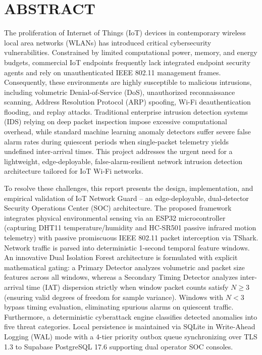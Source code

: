 \documentclass[11pt,a4paper]{report}
\begin{document}
\clearpage

\chapter*{ABSTRACT}
\thispagestyle{plain}
\setcounter{page}{3}

The proliferation of Internet of Things (IoT) devices in contemporary wireless local area networks (WLANs) has introduced critical cybersecurity vulnerabilities. Constrained by limited computational power, memory, and energy budgets, commercial IoT endpoints frequently lack integrated endpoint security agents and rely on unauthenticated IEEE 802.11 management frames. Consequently, these environments are highly susceptible to malicious intrusions, including volumetric Denial-of-Service (DoS), unauthorized reconnaissance scanning, Address Resolution Protocol (ARP) spoofing, Wi-Fi deauthentication flooding, and replay attacks. Traditional enterprise intrusion detection systems (IDS) relying on deep packet inspection impose excessive computational overhead, while standard machine learning anomaly detectors suffer severe false alarm rates during quiescent periods when single-packet telemetry yields undefined inter-arrival times. This project addresses the urgent need for a lightweight, edge-deployable, false-alarm-resilient network intrusion detection architecture tailored for IoT Wi-Fi networks.

To resolve these challenges, this report presents the design, implementation, and empirical validation of IoT Network Guard -- an edge-deployable, dual-detector Security Operations Center (SOC) architecture. The proposed framework integrates physical environmental sensing via an ESP32 microcontroller (capturing DHT11 temperature/humidity and HC-SR501 passive infrared motion telemetry) with passive promiscuous IEEE 802.11 packet interception via TShark. Network traffic is parsed into deterministic 1-second temporal feature windows. An innovative Dual Isolation Forest architecture is formulated with explicit mathematical gating: a Primary Detector analyzes volumetric and packet size features across all windows, whereas a Secondary Timing Detector analyzes inter-arrival time (IAT) dispersion strictly when window packet counts satisfy $N \ge 3$ (ensuring valid degrees of freedom for sample variance). Windows with $N < 3$ bypass timing evaluation, eliminating spurious alarms on quiescent traffic. Furthermore, a deterministic cyberattack engine classifies detected anomalies into five threat categories. Local persistence is maintained via SQLite in Write-Ahead Logging (WAL) mode with a 4-tier priority outbox queue synchronizing over TLS 1.3 to Supabase PostgreSQL 17.6 supporting dual operator SOC consoles.
\end{document}

